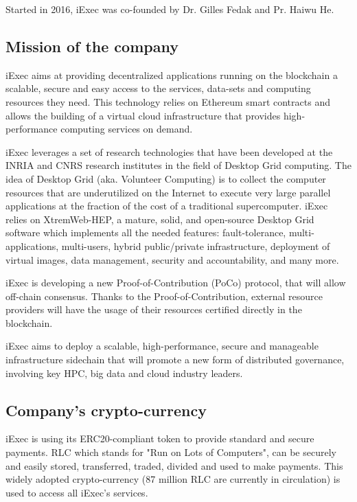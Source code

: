   Started in 2016, iExec\cite{iExec} was co-founded by Dr. Gilles Fedak and Pr. Haiwu He.
  
  \subsection{Mission of the company}
    iExec aims at providing decentralized applications running on the blockchain a scalable,
    secure and easy access to the services, data-sets and computing resources they need. This
    technology relies on Ethereum smart contracts and allows the building of a virtual cloud
    infrastructure that provides high-performance computing services on demand.

    iExec leverages a set of research technologies that have been developed at the INRIA and CNRS
    research institutes in the field of Desktop Grid computing. The idea of Desktop Grid
    (aka. Volunteer Computing) is to collect the computer resources that are underutilized on the
    Internet to execute very large parallel applications at the fraction of the cost of a
    traditional supercomputer. iExec relies on XtremWeb-HEP\cite{xtremweb}, a mature, solid, and open-source Desktop
    Grid software which implements all the needed features: fault-tolerance, multi-applications,
    multi-users, hybrid public/private infrastructure, deployment of virtual images, data management,
    security and accountability, and many more.

    iExec is developing a new Proof-of-Contribution\cite{POCO} (PoCo) protocol, that will allow off-chain
    consensus. Thanks to the Proof-of-Contribution, external resource providers will have the usage
    of their resources certified directly in the blockchain.

    iExec aims to deploy a scalable, high-performance, secure and manageable infrastructure sidechain
    that will promote a new form of distributed governance, involving key HPC, big data and cloud
    industry leaders.

  \subsection{Company's crypto-currency}
    iExec is using its ERC20-compliant token to provide standard and secure payments. RLC\cite{RLC} which stands for
    "Run on Lots of Computers", can be securely and easily stored, transferred, traded, divided and used
    to make payments. This widely adopted crypto-currency (87 million RLC are currently in circulation)
    is used to access all iExec's services.

